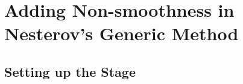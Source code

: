 \documentclass[]{article}
\theoremstyle{definition}
\numberwithin{equation}{subsection}
\begin{document}

\section{Adding Non-smoothness in Nesterov's Generic Method}
    \subsection{Setting up the Stage}
    
\end{document}
